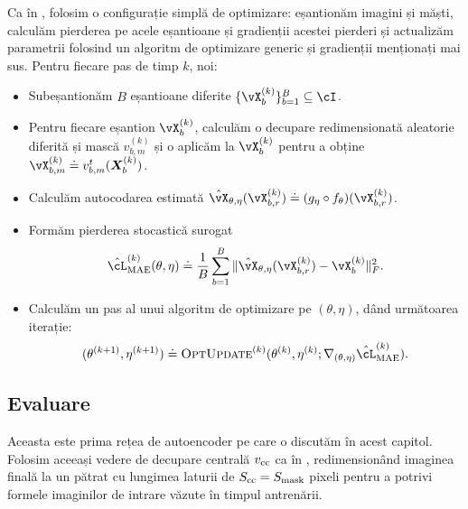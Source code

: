 \documentclass[../../book-main_ro.tex]{subfiles}
\begin{document}
Ca în , folosim o configurație simplă de optimizare: eșantionăm imagini și măști, calculăm pierderea pe acele eșantioane și gradienții acestei pierderi și actualizăm parametrii folosind un algoritm de optimizare generic și gradienții menționați mai sus. Pentru fiecare pas de timp \(k\), noi:
\begin{itemize}
    \item Subeșantionăm \(B\) eșantioane diferite \(\{\vX_{b}^{(k)}\}_{b = 1}^{B} \subseteq \cI\).
    \item Pentru fiecare eșantion \(\vX_{b}^{(k)}\), calculăm o decupare redimensionată aleatorie diferită și mască \(v_{b, m}^{(k)}\) și o aplicăm la \(\vX_{b}^{(k)}\) pentru a obține \(\vX_{b, m}^{(k)} \doteq v_{b, m}^{t}(\X_{b}^{(k)})\).
    \item Calculăm autocodarea estimată \(\hat{\vX}_{\theta, \eta}(\vX_{b, r}^{(k)}) \doteq (g_{\eta} \circ f_{\theta})(\vX_{b, r}^{(k)})\).
    \item Formăm pierderea stocastică surogat 
    \begin{equation}
        \hat{\cL}_{\mathrm{MAE}}^{(k)}(\theta, \eta) \doteq \frac{1}{B}\sum_{b = 1}^{B}\norm{\hat{\vX}_{\theta, \eta}(\vX_{b, r}^{(k)}) - \vX_{b}^{(k)}}_{F}^{2}.
    \end{equation}
    \item Calculăm un pas al unui algoritm de optimizare pe \((\theta, \eta)\), dând următoarea iterație:
    \begin{equation}
        (\theta^{(k + 1)}, \eta^{(k + 1)}) \doteq \textsc{OptUpdate}^{(k)}(\theta^{(k)}, \eta^{(k)}; \nabla_{(\theta, \eta)}\hat{\cL}_{\mathrm{MAE}}^{(k)}).
    \end{equation}
\end{itemize}

\subsection{Evaluare} \label{sub:image_completion_optimization_1}

Aceasta este prima rețea de autoencoder pe care o discutăm în acest capitol. Folosim aceeași vedere de decupare centrală \(v_{\mathrm{cc}}\) ca în , redimensionând imaginea finală la un pătrat cu lungimea laturii de \(S_{\mathrm{cc}} = S_{\mathrm{mask}}\) pixeli pentru a potrivi formele imaginilor de intrare văzute în timpul antrenării. 
\end{document}
